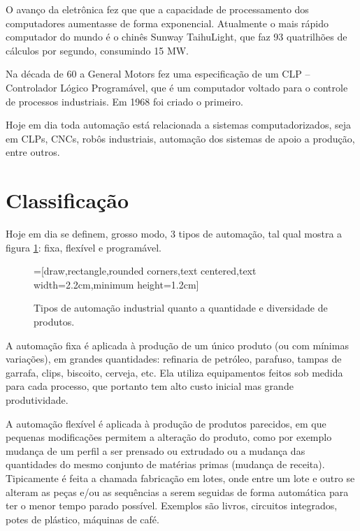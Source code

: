 O avanço da eletrônica fez que que a capacidade de processamento dos computadores aumentasse de forma exponencial. Atualmente o mais rápido computador do mundo é o chinês Sunway TaihuLight, que faz 93 quatrilhões de cálculos por segundo, consumindo 15 MW.

Na década de 60 a General Motors fez uma especificação de um CLP -- Controlador Lógico Programável, que é um computador voltado para o controle de processos industriais. Em 1968 foi criado o primeiro.

Hoje em dia toda automação está relacionada a sistemas computadorizados, seja em CLPs, CNCs, robôs industriais, automação dos sistemas de apoio a produção, entre outros.

\section{Classificação}

Hoje em dia se definem, grosso modo, 3 tipos de automação, tal qual mostra a figura \ref{fig:tipos_automacao}: fixa, flexível e programável.
\begin{figure}[hbt]
	\begin{center}
	=[draw,rectangle,rounded corners,text centered,text width=2.2cm,minimum height=1.2cm]
	\end{center}
	\caption{Tipos de automação industrial quanto a quantidade e diversidade de produtos.}
	\label{fig:tipos_automacao}
\end{figure}

A automação fixa é aplicada à produção de um único produto (ou com mínimas variações), em grandes quantidades: refinaria de petróleo, parafuso, tampas de garrafa, clips, biscoito, cerveja, etc. Ela utiliza equipamentos feitos sob medida para cada processo, que portanto tem alto custo inicial mas grande produtividade.

A automação flexível é aplicada à produção de produtos parecidos, em que pequenas modificações permitem a alteração do produto, como por exemplo mudança de um perfil a ser prensado ou extrudado ou a mudança das quantidades do mesmo conjunto de matérias primas (mudança de receita). Tipicamente é feita a chamada fabricação em lotes, onde entre um lote e outro se alteram as peças e/ou as sequências a serem seguidas de forma automática para ter o menor tempo parado possível. Exemplos são livros, circuitos integrados, potes de plástico, máquinas de café.

